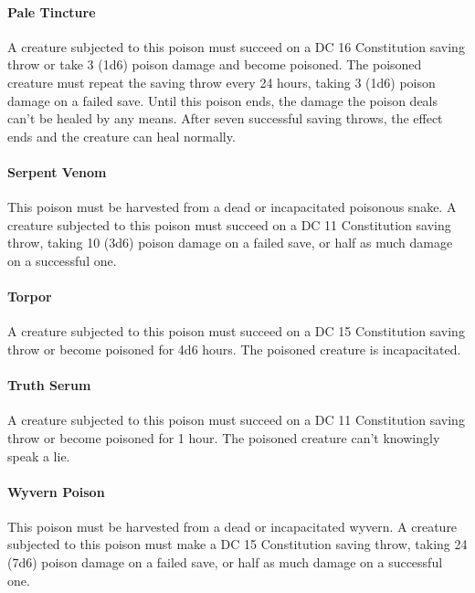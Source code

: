     \paragraph{Pale Tincture}
        A creature subjected to this poison must succeed on a DC 16 Constitution saving throw or take 3 (1d6) poison damage and become poisoned.
        The poisoned creature must repeat the saving throw every 24 hours, taking 3 (1d6) poison damage on a failed save.
        Until this poison ends, the damage the poison deals can't be healed by any means.
        After seven successful saving throws, the effect ends and the creature can heal normally.
    \paragraph{Serpent Venom}
        This poison must be harvested from a dead or incapacitated poisonous snake.
        A creature subjected to this poison must succeed on a DC 11 Constitution saving throw, taking 10 (3d6) poison damage on a failed save, or half as much damage on a successful one.
    \paragraph{Torpor}
        A creature subjected to this poison must succeed on a DC 15 Constitution saving throw or become poisoned for 4d6 hours.
        The poisoned creature is incapacitated.
    \paragraph{Truth Serum}
        A creature subjected to this poison must succeed on a DC 11 Constitution saving throw or become poisoned for 1 hour.
        The poisoned creature can't knowingly speak a lie.
    \paragraph{Wyvern Poison}
        This poison must be harvested from a dead or incapacitated wyvern.
        A creature subjected to this poison must make a DC 15 Constitution saving throw, taking 24 (7d6) poison damage on a failed save, or half as much damage on a successful one.
\newpage~\newpage
